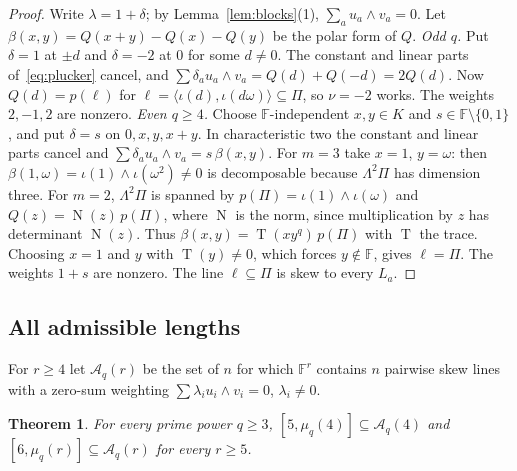 \documentclass[11pt]{amsart}
\newtheorem{theorem}{Theorem}[section]
\theoremstyle{definition}
\theoremstyle{remark}
\newcommand{\F}{\mathbb F}
\newcommand{\Tr}{\operatorname{T}}
\newcommand{\N}{\operatorname{N}}
\begin{document}
\begin{proof}
Write $\lambda=1+\delta$; by Lemma~\ref{lem:blocks}(1), $\sum_au_a\wedge v_a=0$. Let $\beta(x,y)=Q(x+y)-Q(x)-Q(y)$ be the polar form of $Q$.
\emph{Odd $q$.} Put $\delta=1$ at $\pm d$ and $\delta=-2$ at $0$ for some $d\ne0$. The constant and linear parts of~\eqref{eq:plucker} cancel, and $\sum\delta_au_a\wedge v_a=Q(d)+Q(-d)=2Q(d)$. Now $Q(d)=p(\ell)$ for $\ell=\langle\iota(d),\iota(d\omega)\rangle\subseteq\Pi$, so $\nu=-2$ works. The weights $2,-1,2$ are nonzero.
\emph{Even $q\ge4$.} Choose $\F$-independent $x,y\in K$ and $s\in\F\setminus\{0,1\}$, and put $\delta=s$ on $0,x,y,x+y$. In characteristic two the constant and linear parts cancel and $\sum\delta_au_a\wedge v_a=s\,\beta(x,y)$. For $m=3$ take $x=1$, $y=\omega$: then $\beta(1,\omega)=\iota(1)\wedge\iota(\omega^2)\ne0$ is decomposable because $\Lambda^2\Pi$ has dimension three. For $m=2$, $\Lambda^2\Pi$ is spanned by $p(\Pi)=\iota(1)\wedge\iota(\omega)$ and $Q(z)=\N(z)\,p(\Pi)$, where $\N$ is the norm, since multiplication by $z$ has determinant $\N(z)$. Thus $\beta(x,y)=\Tr(xy^q)\,p(\Pi)$ with $\Tr$ the trace. Choosing $x=1$ and $y$ with $\Tr(y)\ne0$, which forces $y\notin\F$, gives $\ell=\Pi$. The weights $1+s$ are nonzero.
The line $\ell\subseteq\Pi$ is skew to every $L_a$.
\end{proof}

\subsection{All admissible lengths}
For $r\ge4$ let $\mathcal A_q(r)$ be the set of $n$ for which $\F^r$ contains $n$ pairwise skew lines with a zero-sum weighting $\sum\lambda_iu_i\wedge v_i=0$, $\lambda_i\ne0$.

\begin{theorem}\label{thm:construct}
For every prime power $q\ge3$, $[5,\mu_q(4)]\subseteq\mathcal A_q(4)$ and $[6,\mu_q(r)]\subseteq\mathcal A_q(r)$ for every $r\ge5$.
\end{theorem}
\end{document}

